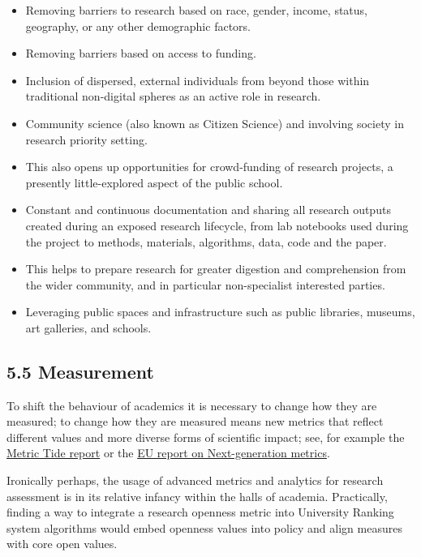 \begin{itemize}
\item
  Removing barriers to research based on race, gender, income, status,
  geography, or any other demographic factors.
\item
  Removing barriers based on access to funding.
\item
  Inclusion of dispersed, external individuals from beyond those within
  traditional non-digital spheres as an active role in research.
\item
  Community science (also known as Citizen Science) and involving
  society in research priority setting.
\item
  This also opens up opportunities for crowd-funding of research
  projects, a presently little-explored aspect of the public school.
\item
  Constant and continuous documentation and sharing all research outputs
  created during an exposed research lifecycle, from lab notebooks used
  during the project to methods, materials, algorithms, data, code and
  the paper.
\item
  This helps to prepare research for greater digestion and comprehension
  from the wider community, and in particular non-specialist interested
  parties.
\item
  Leveraging public spaces and infrastructure such as public libraries,
  museums, art galleries, and schools.
\end{itemize}

\subsection{5.5 Measurement }\label{measurement}

To shift the behaviour of academics it is necessary to change how they
are measured; to change how they are measured means new metrics that
reflect different values and more diverse forms of scientific impact;
see, for example the
\href{https://responsiblemetrics.org/the-metric-tide/}{Metric Tide
report} or the
\href{https://ec.europa.eu/research/openscience/pdf/report.pdf}{EU
report on Next-generation metrics}.

Ironically perhaps, the usage of advanced metrics and analytics for
research assessment is in its relative infancy within the halls of
academia. Practically, finding a way to integrate a research openness
metric into University Ranking system algorithms would embed openness
values into policy and align measures with core open values.

